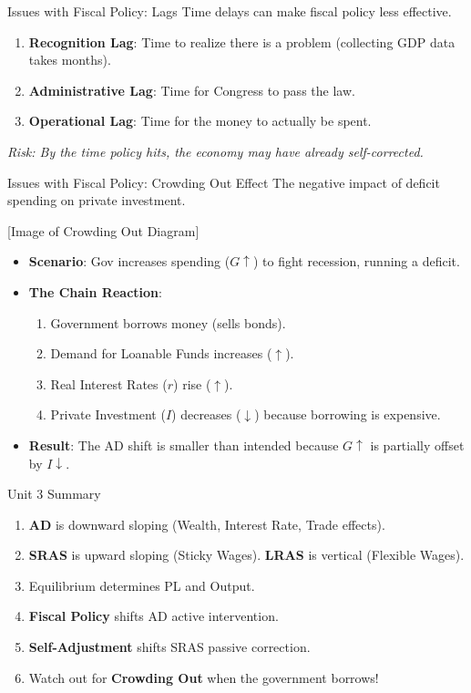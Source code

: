 \documentclass{beamer}
\begin{document}
\begin{frame}{Issues with Fiscal Policy: Lags}
    Time delays can make fiscal policy less effective.
    \begin{enumerate}
        \item \textbf{Recognition Lag}: Time to realize there is a problem (collecting GDP data takes months).
        \item \textbf{Administrative Lag}: Time for Congress to pass the law.
        \item \textbf{Operational Lag}: Time for the money to actually be spent.
    \end{enumerate}
    \vspace{0.3cm}
    \textit{Risk: By the time policy hits, the economy may have already self-corrected.}
\end{frame}

\begin{frame}{Issues with Fiscal Policy: Crowding Out Effect}
    The negative impact of deficit spending on private investment.
    

[Image of Crowding Out Diagram]

    \begin{itemize}
        \item \textbf{Scenario}: Gov increases spending ($G \uparrow$) to fight recession, running a deficit.
        \item \textbf{The Chain Reaction}:
        \begin{enumerate}
            \item Government borrows money (sells bonds).
            \item Demand for Loanable Funds increases ($\uparrow$).
            \item Real Interest Rates ($r$) rise ($\uparrow$).
            \item Private Investment ($I$) decreases ($\downarrow$) because borrowing is expensive.
        \end{enumerate}
        \item \textbf{Result}: The AD shift is smaller than intended because $G \uparrow$ is partially offset by $I \downarrow$.
    \end{itemize}
\end{frame}

\begin{frame}{Unit 3 Summary}
    \begin{enumerate}
        \item \textbf{AD} is downward sloping (Wealth, Interest Rate, Trade effects).
        \item \textbf{SRAS} is upward sloping (Sticky Wages). \textbf{LRAS} is vertical (Flexible Wages).
        \item Equilibrium determines PL and Output.
        \item \textbf{Fiscal Policy} shifts AD active intervention.
        \item \textbf{Self-Adjustment} shifts SRAS passive correction.
        \item Watch out for \textbf{Crowding Out} when the government borrows!
    \end{enumerate}
\end{frame}
\end{document}
